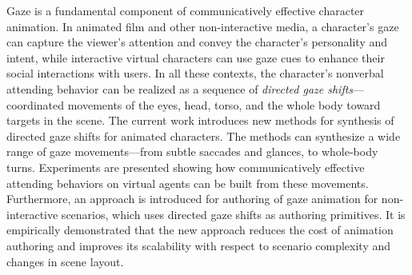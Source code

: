 Gaze is a fundamental component of communicatively effective character animation. In animated film and other non-interactive media, a character's gaze can capture the viewer's attention and convey the character's personality and intent, while interactive virtual characters can use gaze cues to enhance their social interactions with users. In all these contexts, the character's nonverbal attending behavior can be realized as a sequence of \emph{directed gaze shifts}---coordinated movements of the eyes, head, torso, and the whole body toward targets in the scene.
The current work introduces new methods for synthesis of directed gaze shifts for animated characters. The methods can synthesize a wide range of gaze movements---from subtle saccades and glances, to whole-body turns. Experiments are presented showing how communicatively effective attending behaviors on virtual agents can be built from these movements.
Furthermore, an approach is introduced for authoring of gaze animation for non-interactive scenarios, which uses directed gaze shifts as authoring primitives. It is empirically demonstrated that the new approach reduces the cost of animation authoring and improves its scalability with respect to scenario complexity and changes in scene layout.
